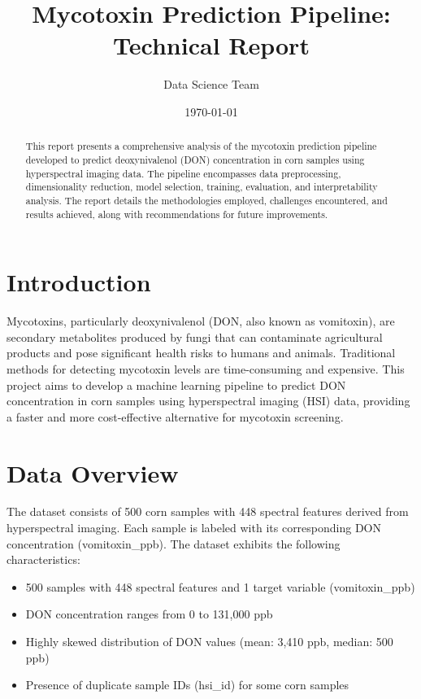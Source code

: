 \documentclass{article}
\title{Mycotoxin Prediction Pipeline: Technical Report}
\author{Data Science Team}
\date{\today}
\begin{document}
\maketitle

\begin{abstract}
This report presents a comprehensive analysis of the mycotoxin prediction pipeline developed to predict deoxynivalenol (DON) concentration in corn samples using hyperspectral imaging data. The pipeline encompasses data preprocessing, dimensionality reduction, model selection, training, evaluation, and interpretability analysis. The report details the methodologies employed, challenges encountered, and results achieved, along with recommendations for future improvements.
\end{abstract}

\section{Introduction}
Mycotoxins, particularly deoxynivalenol (DON, also known as vomitoxin), are secondary metabolites produced by fungi that can contaminate agricultural products and pose significant health risks to humans and animals. Traditional methods for detecting mycotoxin levels are time-consuming and expensive. This project aims to develop a machine learning pipeline to predict DON concentration in corn samples using hyperspectral imaging (HSI) data, providing a faster and more cost-effective alternative for mycotoxin screening.

\section{Data Overview}
The dataset consists of 500 corn samples with 448 spectral features derived from hyperspectral imaging. Each sample is labeled with its corresponding DON concentration (vomitoxin\_ppb). The dataset exhibits the following characteristics:

\begin{itemize}
    \item 500 samples with 448 spectral features and 1 target variable (vomitoxin\_ppb)
    \item DON concentration ranges from 0 to 131,000 ppb
    \item Highly skewed distribution of DON values (mean: 3,410 ppb, median: 500 ppb)
    \item Presence of duplicate sample IDs (hsi\_id) for some corn samples
\end{itemize}
\end{document}
